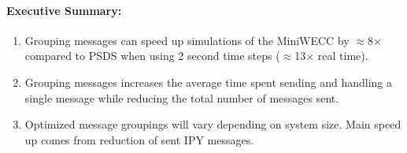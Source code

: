 \documentclass[12pt]{article}
\begin{document}
\paragraph{Executive Summary:} 
\begin{enumerate}
\item Grouping messages can speed up simulations of the MiniWECC by $\approx$8$\times$ compared to PSDS when using 2 second time steps ($\approx$13$\times$ real time).
\item Grouping messages increases the average time spent sending and handling a single message while reducing the total number of messages sent.
\item Optimized message groupings will vary depending on system size. Main speed up comes from reduction of sent IPY messages.
\end{enumerate}
\end{document}
